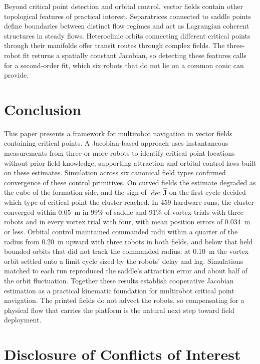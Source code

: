 \documentclass[lettersize,journal]{IEEEtran}
\newcommand{\rev}[1]{#1}
\begin{document}
Beyond critical point detection and orbital control, vector fields contain other topological features of practical interest. Separatrices connected to saddle points define boundaries between distinct flow regimes and act as Lagrangian coherent structures in steady flows. Heteroclinic orbits connecting different critical points through their manifolds offer transit routes through complex fields. The three-robot fit returns a spatially constant Jacobian, so detecting these features calls for a second-order fit, which six robots that do not lie on a common conic can provide.



\section{Conclusion}
\noindent

This paper presents a framework for multirobot navigation in vector fields containing critical points. A Jacobian-based approach uses instantaneous measurements from three or more robots to identify critical point locations without prior field knowledge, supporting attraction and orbital control laws built on these estimates. Simulation across six canonical field types confirmed convergence of these control primitives. On curved fields the estimate degraded as the cube of the formation side, and the sign of $\det\hat{\mathbf{J}}$ on the first cycle decided which type of critical point the cluster reached. In \rev{459} hardware runs, the cluster converged within 0.05~m in \rev{99}\% of saddle and \rev{91}\% of vortex trials with three robots and in every vortex trial with four, with mean position errors of \rev{0.034}~m or less. Orbital control maintained commanded radii within a quarter of the radius from \rev{0.20}~m upward with three robots in both fields, and below that held bounded orbits that did not track the commanded radius; at 0.10~m the vortex orbit settled onto a limit cycle sized by the robots' delay and lag. Simulations matched to each run reproduced the saddle's attraction error and about half of the orbit fluctuation.
Together these results establish cooperative Jacobian estimation as a practical kinematic foundation for multirobot critical point navigation. The printed fields do not advect the robots, so compensating for a physical flow that carries the platform is the natural next step toward field deployment.


\section*{Disclosure of Conflicts of Interest}
\end{document}
